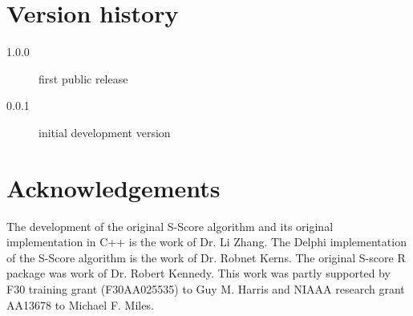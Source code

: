 \documentclass[12pt]{article}
\begin{document}
\section{Version history}

\begin{description}
\item[1.0.0] first public release
\item[0.0.1] initial development version
\end{description}

\section{Acknowledgements}
The development of the original S-Score algorithm and its original implementation in C++ is the work of Dr. Li Zhang. The Delphi implementation of the S-Score algorithm is the work of Dr. Robnet Kerns.  The original S-score R package was work of Dr. Robert Kennedy.  This work was partly supported by F30 training grant (F30AA025535) to Guy M. Harris and NIAAA research grant AA13678 to Michael F. Miles.



\end{document}
